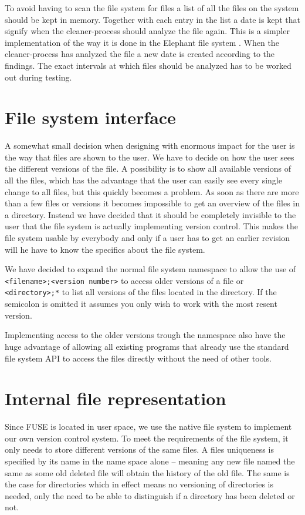 \documentclass[12pt]{article}
\begin{document}
To avoid having to scan the file system for files a list of all the
files on the system should be kept in memory. Together with each entry
in the list a date is kept that signify when the cleaner-process
should analyze the file again. This is a simpler implementation of the
way it is done in the Elephant file system \cite{Santry:1999gf}. When
the cleaner-process has analyzed the file a new date is created
according to the findings. The exact intervals at which files should
be analyzed has to be worked out during testing.

\section{File system interface}
A somewhat small decision when designing with enormous impact for the
user is the way that files are shown to the user.
We have to decide on how the user sees the different versions of the
file. A possibility is to show all available versions of all the
files,
which has the advantage that the user can easily see every single
change to all files, but this quickly becomes a problem.
As soon as there are more than a few files or versions it becomes
impossible to get an overview of the files in a directory.
Instead we have decided that it should be completely invisible to the
user that the file system is actually implementing version control.
This makes the file system usable by everybody and only if a user has
to get an earlier revision will he have to know the specifics about
the file system.

We have decided to expand the normal file system namespace to allow
the use of \texttt{<filename>;<version number>} to access older versions
of a file or \texttt{<directory>;*} to list all versions of the files
located in the directory. If the semicolon is omitted it assumes you
only wish to work with the most resent version.

Implementing access to the older versions trough the namespace also
have the huge advantage of allowing all existing programs that already
use the standard file system API to access the files directly without
the need of other tools.

\section{Internal file representation}
Since FUSE is located in user space, we use the native file system to
implement our own version control system. To meet the requirements of
the file system, it only needs to store different versions of the same
files. A files uniqueness is specified by its name in the name space
alone – meaning any new file named the same as some old deleted file
will obtain the history of the old file. The same is the case for
directories which in effect means no versioning of directories is
needed, only the need to be able to distinguish if a directory has
been deleted or not.
\end{document}
